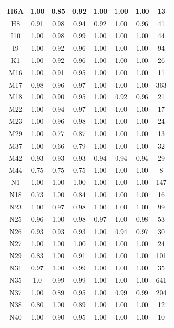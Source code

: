 \documentclass[10pt,onecolumn,letterpaper]{article}
\begin{document}
\begin{longtable}{|c|c|c|c|c|c|c|c|}
		H6A & 1.00 & 0.85 & 0.92    &1.00&1.00&1.00& 13 \\ \hline
		H8 & 0.91 & 0.98 & 0.94    &0.92&1.00&0.96&  41 \\ \hline
		I10 & 1.00 & 0.98 & 0.99   &1.00&1.00&1.00&   44 \\ \hline
		I9 & 1.00 & 0.92 & 0.96   &1.00&1.00&1.00&   94 \\ \hline
		K1 & 1.00 & 0.92 & 0.96   &1.00&1.00&1.00&   26 \\ \hline
		M16 & 1.00 & 0.91 & 0.95    &1.00&1.00&1.00& 11 \\ \hline
		M17 & 0.98 & 0.96 & 0.97 &1.00&1.00&1.00& 363 \\ \hline
		M18 & 1.00 & 0.90 & 0.95  &1.00&0.92&0.96&    21 \\ \hline
		M22 & 1.00 & 0.94 & 0.97    &1.00&1.00&1.00& 17 \\ \hline
		M23 & 1.00 & 0.96 & 0.98   &1.00&1.00&1.00&   24 \\ \hline
		M29 & 1.00 & 0.77 & 0.87    &1.00&1.00&1.00& 13 \\ \hline
		M37 & 1.00 & 0.66 & 0.79    &1.00&1.00&1.00&  32 \\ \hline
		M42 & 0.93 & 0.93 & 0.93   &0.94&0.94&0.94&   29 \\ \hline
		M44 & 0.75 & 0.75 & 0.75   &1.00&1.00&1.00&    8 \\ \hline
		N1 & 1.00 & 1.00 & 1.00   &1.00&1.00&1.00& 147 \\ \hline
		N18 & 0.73 & 1.00 & 0.84    &1.00&1.00&1.00& 16 \\ \hline
		N23 & 1.00 & 0.97 & 0.98   &1.00&1.00&1.00&   99 \\ \hline
		N25 & 0.96 & 1.00 & 0.98   &0.97&1.00&0.98&   53 \\ \hline
		N26 & 0.93 & 0.93 & 0.93   &1.00&0.94&0.97&   30 \\ \hline
		N27 & 1.00 & 1.00 & 1.00  &1.00&1.00&1.00&    24 \\ \hline
		N29 & 0.83 & 1.00 & 0.91   &1.00&1.00&1.00& 101 \\ \hline
		N31 & 0.97 & 1.00 & 0.99   &1.00&1.00&1.00&   35 \\ \hline
		N35 & 1.0 & 0.99 & 0.99 &1.00&1.00&1.00& 641 \\ \hline
		N37 & 1.00 & 0.89 & 0.95 &1.00&0.99&0.99& 204 \\ \hline
		N38 & 0.80 & 1.00 & 0.89    &1.00&1.00&1.00&12 \\ \hline
		N40 & 1.00 & 0.90 & 0.95    &1.00&1.00&1.00& 10 \\ \hline

\end{longtable}
\end{document}
